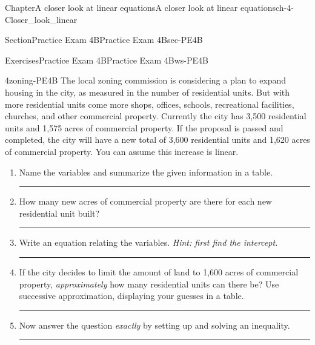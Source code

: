 \documentclass[twoside,11pt,]{book}
\newlength{\workspacestrutwidth}
\numberwithin{equation}{section}
\begin{document}
\begin{chapterptx}{Chapter}{A closer look at linear equations}{}{A closer look at linear equations}{}{}{ch-4-Closer_look_linear}
\begin{sectionptx}{Section}{Practice Exam 4B}{}{Practice Exam 4B}{}{}{sec-PE4B}
\begin{exercises-subsection-numberless}{Exercises}{Practice Exam 4B}{}{Practice Exam 4B}{}{}{ws-PE4B}
\begin{divisionexercise}{4}{}{}{zoning-PE4B}
The local zoning commission is considering a plan to expand housing in the city, as measured in the number of residential units. But with more residential units come more shops, offices, schools, recreational facilities, churches, and other commercial property. Currently the city has 3,500 residential units and 1,575 acres of commercial property. If the proposal is passed and completed, the city will have a new total of 3,600 residential units and 1,620 acres of commercial property. You can assume this increase is linear.%
\begin{enumerate}[label=(\alph*),ref=\alph*]%
\item{}Name the variables and summarize the given information in a table.%
\par\rule{\workspacestrutwidth}{0.75in}%
\item{}How many new acres of commercial property are there for each new residential unit built?%
\par\rule{\workspacestrutwidth}{0.75in}%
\item{}Write an equation relating the variables. \emph{Hint: first find the intercept.}%
\par\rule{\workspacestrutwidth}{1.5in}%
\item{}If the city decides to limit the amount of land to 1,600 acres of commercial property, \emph{approximately} how many residential units can there be? Use successive approximation, displaying your guesses in a table.%
\par\rule{\workspacestrutwidth}{0.75in}%
\item{}Now answer the question \emph{exactly} by setting up and solving an inequality.%
\par\rule{\workspacestrutwidth}{0.75in}%
\end{enumerate}%
\end{divisionexercise}%
\end{exercises-subsection-numberless}
\end{sectionptx}
\end{chapterptx}
%
%
\typeout{************************************************}
\typeout{************************************************}
%
\end{document}
